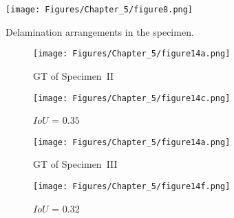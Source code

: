 \begin{figure} [h!]
	\centering
	\texttt{[image: Figures/Chapter\_5/figure8.png]}
	\caption{Delamination arrangements in the specimen.}
	\label{fig:specime}
\end{figure}
\begin{figure} [!h]
	\centering
	\begin{subfigure}[b]{0.47\textwidth}
		\centering
		\texttt{[image: Figures/Chapter\_5/figure14a.png]}
		\caption{GT of Specimen~II}
		\label{fig:gt_specimen_2}
	\end{subfigure}
	\hfill
	\begin{subfigure}[b]{0.47\textwidth}
		\centering
		\texttt{[image: Figures/Chapter\_5/figure14c.png]}
		\caption{\(IoU\) = \(0.35\)} 
		\label{fig:L3_S2_B_ijjeh}
	\end{subfigure}
	\par\medskip
	\begin{subfigure}[b]{0.47\textwidth}
		\centering
		\texttt{[image: Figures/Chapter\_5/figure14a.png]}
		\caption{GT of Specimen~III}
		\label{fig:gt_specimen_3}
	\end{subfigure}
	\hfill
	\begin{subfigure}[b]{0.47\textwidth}
		\centering
		\texttt{[image: Figures/Chapter\_5/figure14f.png]}
		\caption{\(IoU\) = \(0.32\)} 
		\label{fig:L3_S3_B_ijjeh}
	\end{subfigure}
	\par\medskip
	\begin{subfigure}[b]{0.47\textwidth}

\end{subfigure}
\end{figure}
